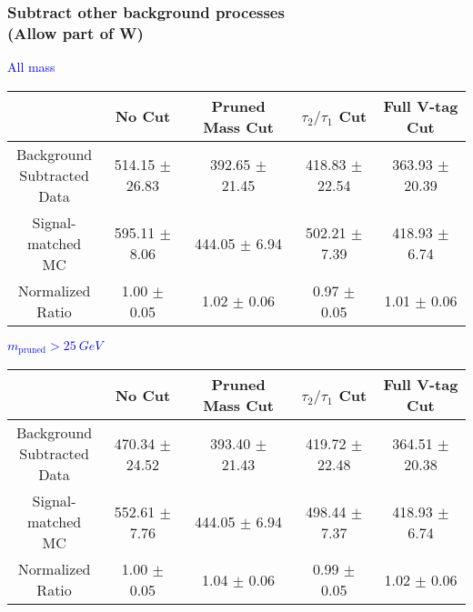 \documentclass{beamer}
\begin{document}
\begin{frame}
  \frametitle{Subtract other background processes \\ (Allow part of W)}
  \begin{adjustwidth}{-1.5em}{-1.5em}
    \centering
    \vspace{6pt}
    \textcolor{blue}{All mass}
    \vspace{6pt}

    {\scriptsize
      \begin{tabular}{c | c | c | c | c}
\hline
 & No Cut & Pruned Mass Cut & $\tau_2/\tau_1$ Cut & Full V-tag Cut \\
\hline
\makecell{Background \\ Subtracted \\ Data} & 514.15 $\pm$ 26.83 & 392.65 $\pm$ 21.45 & 418.83 $\pm$ 22.54 & 363.93 $\pm$ 20.39 \\
\makecell{Signal-\\ matched MC} & 595.11 $\pm$ 8.06 & 444.05 $\pm$ 6.94 & 502.21 $\pm$ 7.39 & 418.93 $\pm$ 6.74 \\
\hline
\makecell{Normalized \\ Ratio} & 1.00 $\pm$ 0.05 & 1.02 $\pm$ 0.06 & 0.97 $\pm$ 0.05 & 1.01 $\pm$ 0.06 \\
\hline
      \end{tabular}
    }

    \vspace{6pt}
    \textcolor{blue}{$m_\text{pruned} > \SI{25}{GeV}$}
    \vspace{6pt}

    {\scriptsize
      \begin{tabular}{c | c | c | c | c}
\hline
 & No Cut & Pruned Mass Cut & $\tau_2/\tau_1$ Cut & Full V-tag Cut \\
\hline
\makecell{Background \\ Subtracted \\ Data} & 470.34 $\pm$ 24.52 & 393.40 $\pm$ 21.43 & 419.72 $\pm$ 22.48 & 364.51 $\pm$ 20.38 \\
\makecell{Signal-\\ matched MC} & 552.61 $\pm$ 7.76 & 444.05 $\pm$ 6.94 & 498.44 $\pm$ 7.37 & 418.93 $\pm$ 6.74 \\
\hline
\makecell{Normalized \\ Ratio} & 1.00 $\pm$ 0.05 & 1.04 $\pm$ 0.06 & 0.99 $\pm$ 0.05 & 1.02 $\pm$ 0.06 \\
\hline
      \end{tabular}
    }
  \end{adjustwidth}
\end{frame}
\end{document}
